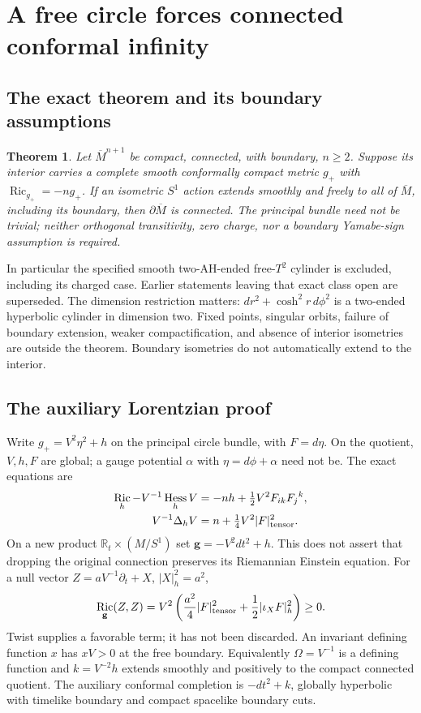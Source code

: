 \documentclass[11pt]{article}
\DeclareMathOperator{\Ric}{Ric}\DeclareMathOperator{\Rm}{Rm}
\DeclareMathOperator{\Hess}{Hess}\DeclareMathOperator{\Isom}{Isom}
\newcommand{\R}{\mathbb R}\newcommand{\C}{\mathbb C}\newcommand{\Z}{\mathbb Z}
\newtheorem{theorem}{Theorem}[section]
\theoremstyle{definition}\newtheorem{problem}[theorem]{Open problem}
\theoremstyle{remark}\newtheorem{remark}[theorem]{Scope}
\numberwithin{equation}{section}
\begin{document}
\section{A free circle forces connected conformal infinity}\label{sec:circle}
\subsection{The exact theorem and its boundary assumptions}\label{sec:circle-statement}
\begin{theorem}\label{thm:circle}
Let $\overline M^{n+1}$ be compact, connected, with boundary, $n\ge2$. Suppose its interior carries a complete smooth conformally compact metric $g_+$ with $\Ric_{g_+}=-ng_+$. If an isometric $S^1$ action extends smoothly and freely to all of $\overline M$, including its boundary, then $\partial\overline M$ is connected. The principal bundle need not be trivial; neither orthogonal transitivity, zero charge, nor a boundary Yamabe-sign assumption is required.
\end{theorem}
In particular the specified smooth two-AH-ended free-$T^2$ cylinder is excluded, including its charged case. Earlier statements leaving that exact class open are superseded. The dimension restriction matters: $dr^2+\cosh^2r\,d\phi^2$ is a two-ended hyperbolic cylinder in dimension two. Fixed points, singular orbits, failure of boundary extension, weaker compactification, and absence of interior isometries are outside the theorem. Boundary isometries do not automatically extend to the interior.

\subsection{The auxiliary Lorentzian proof}\label{sec:lorentz}
Write $g_+=V^2\eta^2+h$ on the principal circle bundle, with $F=d\eta$. On the quotient, $V,h,F$ are global; a gauge potential $\alpha$ with $\eta=d\phi+\alpha$ need not be. The exact equations are
\begin{align}
 \Ric_h-V^{-1}\Hess_hV&=-nh+\tfrac12V^2F_{ik}F_j{}^k,\\
 V^{-1}\Delta_hV&=n+\tfrac14V^2|F|_{\rm tensor}^2.
\end{align}
On a new product $\R_t\times(M/S^1)$ set $\mathbf g=-V^2dt^2+h$. This does not assert that dropping the original connection preserves its Riemannian Einstein equation. For a null vector $Z=aV^{-1}\partial_t+X$, $|X|_h^2=a^2$,
\begin{equation}\label{eq:null}
 \Ric_{\mathbf g}(Z,Z)=V^2\left(\frac{a^2}{4}|F|_{\rm tensor}^2+
 \frac12|\iota_XF|_h^2\right)\ge0.
\end{equation}
Twist supplies a favorable term; it has not been discarded. An invariant defining function $x$ has $xV>0$ at the free boundary. Equivalently $\Omega=V^{-1}$ is a defining function and $k=V^{-2}h$ extends smoothly and positively to the compact connected quotient. The auxiliary conformal completion is $-dt^2+k$, globally hyperbolic with timelike boundary and compact spacelike boundary cuts.
\end{document}
